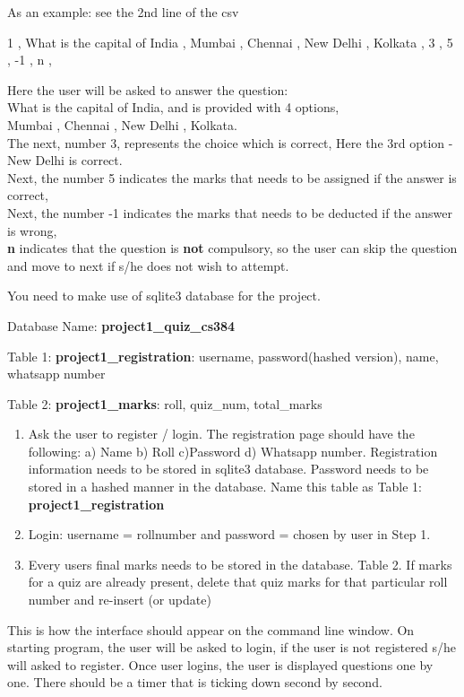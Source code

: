 \documentclass[12pt]{article}
\begin{document}
As an example: see the 2nd line of the csv 


1 , What is the capital of India , Mumbai , Chennai , New Delhi , Kolkata , 3 , 5 , -1 , n , 


Here the user will be asked to answer the question:\\ What is the capital of India, and is provided with 4 options,\\ Mumbai , Chennai , New Delhi , Kolkata. \\The next, number 3, represents the choice which is correct, Here the 3rd option - New Delhi is correct. \\Next, the number 5 indicates the marks that needs to be assigned if the answer is correct, \\ Next, the number -1 indicates the marks that needs to be deducted if the answer is wrong,\\ \textbf{n} indicates that the question is \textbf{not} compulsory, so the user can skip the question and move to next if s/he does not wish to attempt.

You need to make use of sqlite3 database for the project.

Database Name: \textbf{project1\_quiz\_cs384}

Table 1: \textbf{project1\_registration}: username, password(hashed version), name, whatsapp number

Table 2: \textbf{project1\_marks}: roll, quiz\_num, total\_marks
\begin{enumerate}
	\item Ask the user to register / login. The registration page should have the following: a) Name b) Roll c)Password d) Whatsapp number. Registration information needs to be stored in sqlite3 database. Password needs to be stored in a hashed manner in the database. Name this table as Table 1: \textbf{project1\_registration}
	
	\item Login: username = rollnumber and password = chosen by user in Step 1.  
	
	\item Every users final marks needs to be stored in the database. Table 2. If marks for a quiz are already present, delete that quiz marks for that particular roll number and re-insert (or update)
	
	
\end{enumerate}

This is how the interface should appear on the command line window. On starting program, the user will be asked to login, if the user is not registered s/he will asked to register. Once user logins, the user is displayed questions one by one. There should be a timer that is ticking down second by second. 
\end{document}
